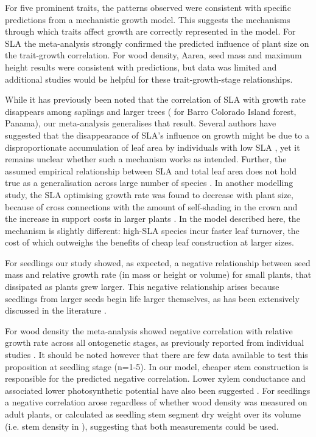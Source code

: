 \documentclass[a4paper,11pt]{article}
\begin{document}
For five prominent traits, the patterns observed were consistent with specific predictions from a mechanistic growth model. This suggests the mechanisms through which traits affect growth are correctly represented in the model. For SLA the meta-analysis strongly confirmed the predicted influence of plant size on the trait-growth correlation. For wood density, Aarea, seed mass and maximum height results were consistent with predictions, but data was limited and additional studies would be helpful for these trait-growth-stage relationships.

While it has previously been noted that the correlation of SLA with growth rate disappears among saplings and larger trees (\citealt{Wright:2010tp} for Barro Colorado Island forest, Panama), our meta-analysis generalises that result. Several authors have suggested that the disappearance of SLA's influence on growth might be due to a disproportionate accumulation of leaf area by individuals with low SLA \citep{Reich:1992wm, Poorter:2008iu,Wright:2010tp}, yet it remains unclear whether such a mechanism works as intended. Further, the assumed empirical relationship between SLA and total leaf area does not hold true as a generalisation across large number of species \citep{Duursma-2015}. In another modelling study, the SLA optimising growth rate was found to decrease with plant size, because of cross connections with the amount of self-shading in the crown and the increase in support costs in larger plants \citep{King-1999}. In the model described here, the mechanism is slightly different: high-SLA species incur faster leaf turnover, the cost of which outweighs the benefits of cheap leaf construction at larger sizes.

For seedlings our study showed, as expected, a negative relationship between seed mass and relative growth rate (in mass or height or volume) for small plants, that dissipated as plants grew larger. This negative relationship arises because seedlings from larger seeds begin life larger themselves, as has been extensively discussed in the literature \citep[reviewed by][]{Turnbull:2012ew}.

For wood density the meta-analysis showed negative correlation with relative growth rate across all ontogenetic stages, as previously reported from individual studies \citep{Wright:2010tp,Ruger:2012jv}. It should be noted however that there are few data available to test this proposition at seedling stage (n=1-5). In our model, cheaper stem construction is responsible for the predicted negative correlation. Lower xylem conductance and associated lower photosynthetic potential have also been suggested \citep[reviewed by][]{Chave:2009iy}.
For seedlings a negative correlation arose regardless of whether wood density was measured on adult plants, or calculated as seedling stem segment dry weight over its volume (i.e. stem density in  \citealt{CastroDiez:1998gz}), suggesting that both measurements could be used.
\end{document}
